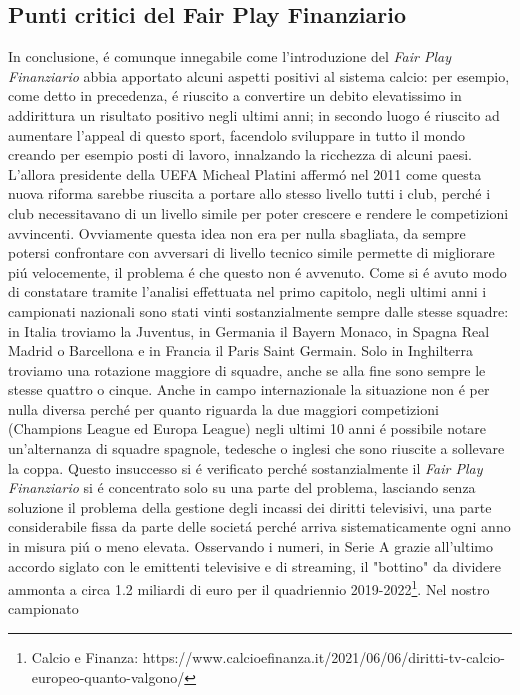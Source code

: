 \documentclass[
    corpo=12pt,
    oneside,
    evenboxes,
    tipotesi=triennale,
    stile=classica,
    oldstyle,
    autoretitolo,
    greek,
]{toptesi}
\begin{document}
\begin{interlinea}{1.5}
\section{Punti critici del Fair Play Finanziario}
In conclusione, \'e comunque innegabile come l'introduzione del \emph{Fair Play Finanziario} abbia apportato alcuni aspetti positivi al 
sistema calcio: per esempio, come detto in precedenza, \'e riuscito a convertire un debito elevatissimo in addirittura un risultato positivo
negli ultimi anni; in secondo luogo \'e riuscito ad aumentare l'appeal di questo sport, facendolo sviluppare in tutto il mondo creando per esempio
posti di lavoro, innalzando la ricchezza di alcuni paesi. L'allora presidente della UEFA Micheal Platini afferm\'o nel 2011 come questa nuova
riforma sarebbe riuscita a portare allo stesso livello tutti i club, perch\'e i club necessitavano di un livello simile per poter crescere e 
rendere le competizioni avvincenti. Ovviamente questa idea non era per nulla sbagliata, da sempre potersi confrontare con avversari di livello tecnico simile
permette di migliorare pi\'u velocemente, il problema \'e che questo non \'e avvenuto. Come si \'e avuto modo di constatare tramite l'analisi
effettuata nel primo capitolo, negli ultimi anni i campionati nazionali sono stati vinti sostanzialmente sempre dalle stesse squadre:
in Italia troviamo la Juventus, in Germania il Bayern Monaco, in Spagna Real Madrid o Barcellona e in Francia il Paris Saint Germain. Solo 
in Inghilterra troviamo una rotazione maggiore di squadre, anche se alla fine sono sempre le stesse quattro o cinque. Anche in campo
internazionale la situazione non \'e per nulla diversa perch\'e per quanto riguarda la due maggiori competizioni (Champions League ed Europa
League) negli ultimi 10 anni \'e possibile notare un'alternanza di squadre spagnole, tedesche o inglesi che sono riuscite a sollevare la coppa.
Questo insuccesso si \'e verificato perch\'e sostanzialmente il \emph{Fair Play Finanziario} si \'e concentrato solo su una parte del problema,
lasciando senza soluzione il problema della gestione degli incassi dei diritti televisivi, una parte considerabile fissa da parte 
delle societ\'a perch\'e arriva sistematicamente ogni anno in misura pi\'u o meno elevata. Osservando i numeri, in Serie A grazie all'ultimo
accordo siglato con le emittenti televisive e di streaming, il "bottino" da dividere ammonta a circa 1.2 miliardi di euro per il quadriennio 
2019-2022\footnote{Calcio e Finanza: https://www.calcioefinanza.it/2021/06/06/diritti-tv-calcio-europeo-quanto-valgono/}. Nel nostro campionato

\end{interlinea}
\end{document}
